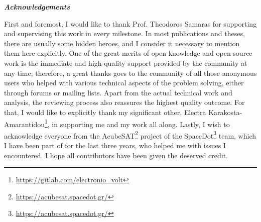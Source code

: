 \thispagestyle{plain}
\begin{center}
    \LARGE
    \textit{\textbf{Acknowledgements}}
        
    \vspace{0.4cm}
\end{center}
\normalsize

\vspace{0.9cm}
First and foremost, I would like to thank Prof. Theodoros Samaras for supporting and supervising this work in every milestone. In most publications and theses, there are usually some hidden heroes, and I consider it necessary to mention them here explicitly. One of the great merits of open knowledge and open-source work is the immediate and high-quality support provided by the community at any time; therefore, a great thanks goes to the community of all those anonymous users who helped with various technical aspects of the problem solving, either through forums or mailing lists. Apart from the actual technical work and analysis, the reviewing process also reassures the highest quality outcome. For that, I would like to explicitly thank my significant other, Electra Karakosta-Amarantidou\footnote{\href{https://gitlab.com/electronio\_volt}{https://gitlab.com/electronio\_volt}}, in supporting me and my work all along. Lastly, I wish to acknowledge everyone from the AcubeSAT\footnote{\href{https://acubesat.spacedot.gr/}{https://acubesat.spacedot.gr/}} project of the SpaceDot\footnote{\href{https://acubesat.spacedot.gr/}{https://acubesat.spacedot.gr/}} team, which I have been part of for the last three years, who helped me with issues I encountered. I hope all contributors have been given the deserved credit.
\vspace*{\fill}
